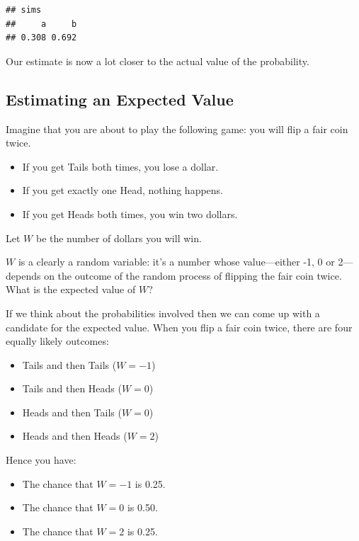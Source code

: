 \documentclass[]{book}
\providecommand{\tightlist}{%
  \setlength{\itemsep}{0pt}\setlength{\parskip}{0pt}}
\theoremstyle{definition}
\theoremstyle{definition}
\theoremstyle{remark}
\begin{document}
{\begin{verbatim}
## sims
##     a     b 
## 0.308 0.692
\end{verbatim}

Our estimate is now a lot closer to the actual value of the probability.

\subsection{Estimating an Expected
Value}\label{estimating-an-expected-value}

Imagine that you are about to play the following game: you will flip a
fair coin twice.

\begin{itemize}
\tightlist
\item
  If you get Tails both times, you lose a dollar.
\item
  If you get exactly one Head, nothing happens.
\item
  If you get Heads both times, you win two dollars.
\end{itemize}

Let \(W\) be the number of dollars you will win.

\(W\) is a clearly a random variable: it's a number whose value---either
-1, 0 or 2---depends on the outcome of the random process of flipping
the fair coin twice. What is the expected value of \(W\)?

If we think about the probabilities involved then we can come up with a
candidate for the expected value. When you flip a fair coin twice, there
are four equally likely outcomes:

\begin{itemize}
\tightlist
\item
  Tails and then Tails (\(W = -1\))
\item
  Tails and then Heads (\(W = 0\))
\item
  Heads and then Tails (\(W = 0\))
\item
  Heads and then Heads (\(W = 2\))
\end{itemize}

Hence you have:

\begin{itemize}
\tightlist
\item
  The chance that \(W=-1\) is 0.25.
\item
  The chance that \(W=0\) is 0.50.
\item
  The chance that \(W=2\) is 0.25.
\end{itemize}

}
\end{document}

